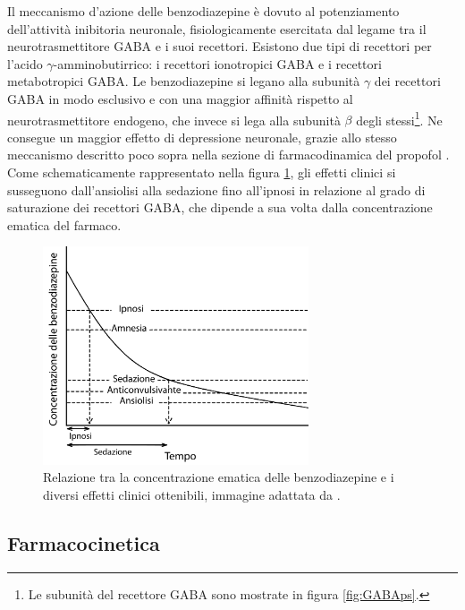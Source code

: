 Il meccanismo d'azione delle benzodiazepine è dovuto al potenziamento dell'attività inibitoria neuronale, fisiologicamente esercitata dal legame tra il neurotrasmettitore GABA e i suoi recettori. Esistono due tipi di recettori per l'acido $\gamma$-amminobutirrico: i recettori ionotropici GABA e i recettori metabotropici GABA. Le benzodiazepine si legano alla subunità $\gamma$ dei recettori GABA in modo esclusivo e con una maggior affinità rispetto al neurotrasmettitore endogeno, che invece si lega alla subunità $\beta$ degli stessi\footnote{Le subunità del recettore GABA sono mostrate in figura \ref{fig:GABAps}.}. Ne consegue un maggior effetto di depressione neuronale, grazie allo stesso meccanismo descritto poco sopra nella sezione di farmacodinamica del propofol \cite{Olkkola2008}. 
\\Come schematicamente rappresentato nella figura \ref{fig:benzo}, gli effetti clinici si susseguono dall'ansiolisi alla sedazione fino all'ipnosi in relazione al grado di saturazione dei recettori GABA, che dipende a sua volta dalla concentrazione ematica del farmaco. 

\begin{figure}[t]
    \centering
    \includegraphics[width=0.7\textwidth]{Figure/BENZOpdf.pdf}
    \caption{Relazione tra la concentrazione ematica delle benzodiazepine e i diversi effetti clinici ottenibili, immagine adattata da \cite{Olkkola2008}.}
    \label{fig:benzo}
\end{figure}

\subsection*{Farmacocinetica}

